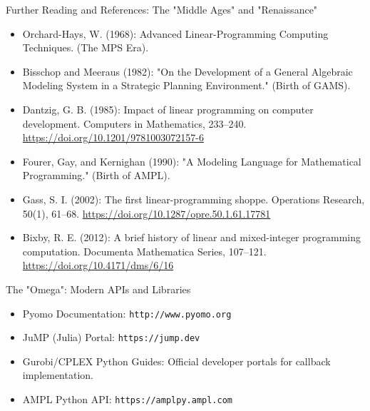 \documentclass[presentation, aspectratio=169]{beamer}
\begin{document}
\begin{frame}[label={sec:org3303491}]{Further Reading and References: The "Middle Ages" and "Renaissance"}
\begin{itemize}
\item \alert{\alert{Orchard-Hays, W. (1968)}}: \alert{Advanced Linear-Programming Computing Techniques}. (The MPS Era).
\item \alert{\alert{Bisschop and Meeraus (1982)}}: "On the Development of a General Algebraic Modeling System in a Strategic Planning Environment." (Birth of GAMS).
\item \alert{\alert{Dantzig, G. B. (1985):}} Impact of linear programming on computer development. Computers in Mathematics, 233–240. \url{https://doi.org/10.1201/9781003072157-6}
\item \alert{\alert{Fourer, Gay, and Kernighan (1990)}}: "A Modeling Language for Mathematical Programming." (Birth of AMPL).
\item \alert{\alert{Gass, S. I. (2002):}} The first linear-programming shoppe. Operations Research, 50(1), 61–68. \url{https://doi.org/10.1287/opre.50.1.61.17781}
\item \alert{\alert{Bixby, R. E. (2012):}} A brief history of linear and mixed-integer programming computation. Documenta Mathematica Series, 107–121. \url{https://doi.org/10.4171/dms/6/16}
\end{itemize}
\end{frame}

\begin{frame}[label={sec:orge5af274},fragile]{The "Omega": Modern APIs and Libraries}
 \begin{itemize}
\item \alert{\alert{Pyomo Documentation}}: \texttt{http://www.pyomo.org}
\item \alert{\alert{JuMP (Julia) Portal}}: \texttt{https://jump.dev}
\item \alert{\alert{Gurobi/CPLEX Python Guides}}: Official developer portals for callback implementation.
\item \alert{\alert{AMPL Python API}}: \texttt{https://amplpy.ampl.com}
\end{itemize}
\end{frame}
\end{document}
